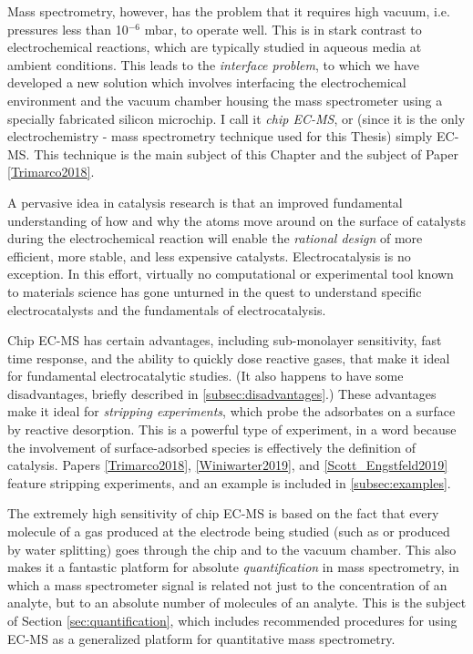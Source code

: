 Mass spectrometry, however, has the problem that it requires high vacuum, i.e. pressures less than 10$^{-6}$ mbar, to operate well. This is in stark contrast to electrochemical reactions, which are typically studied in aqueous media at ambient conditions. This leads to the \textit{interface problem}, to which we have developed a new solution which involves interfacing the electrochemical environment and the vacuum chamber housing the mass spectrometer using a specially fabricated silicon microchip. I call it \textit{chip EC-MS}, or (since it is the only electrochemistry - mass spectrometry technique used for this Thesis) simply EC-MS. This technique is the main subject of this Chapter and the subject of Paper \ref{Trimarco2018}.

A pervasive idea in catalysis research is that an improved fundamental understanding of how and why the atoms move around on the surface of catalysts during the electrochemical reaction will enable the \textit{rational design} of more efficient, more stable, and less expensive catalysts\cite{Fundamentals}. Electrocatalysis is no exception\cite{Pfisterer2017, Katsounaros2014a, Wuttig2016, Seh2017}. In this effort, virtually no computational or experimental tool known to materials science has gone unturned in the quest to understand specific electrocatalysts and the fundamentals of electrocatalysis. 

Chip EC-MS has certain advantages, including sub-monolayer sensitivity, fast time response, and the ability to quickly dose reactive gases, that make it ideal for fundamental electrocatalytic studies. (It also happens to have some disadvantages, briefly described in \ref{subsec:disadvantages}.) These advantages make it ideal for \textit{stripping experiments}, which probe the adsorbates on a surface by reactive desorption. This is a powerful type of experiment, in a word because the involvement of surface-adsorbed species is effectively the definition of catalysis. Papers \ref{Trimarco2018}, \ref{Winiwarter2019}, and \ref{Scott_Engstfeld2019} feature stripping experiments, and an example is included in \ref{subsec:examples}.

The extremely high sensitivity of chip EC-MS is based on the fact that every molecule of a gas produced at the electrode being studied (such as  or  produced by water splitting) goes through the chip and to the vacuum chamber. This also makes it a fantastic platform for absolute \textit{quantification} in mass spectrometry, in which a mass spectrometer signal is related not just to the concentration of an analyte, but to an absolute number of molecules of an analyte. This is the subject of Section \ref{sec:quantification}, which includes recommended procedures for using EC-MS as a generalized platform for quantitative mass spectrometry.

